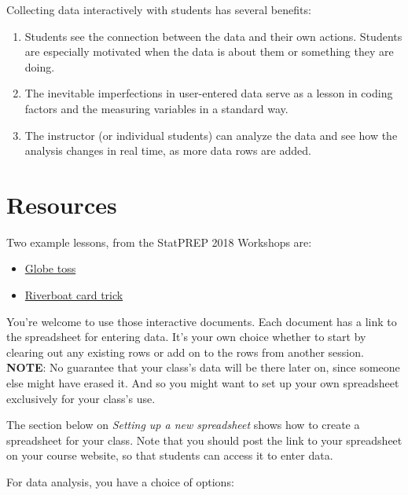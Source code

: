 \documentclass[]{book}
\providecommand{\tightlist}{%
  \setlength{\itemsep}{0pt}\setlength{\parskip}{0pt}}
\theoremstyle{definition}
\theoremstyle{definition}
\theoremstyle{definition}
\theoremstyle{remark}
\begin{document}
Collecting data interactively with students has several benefits:

\begin{enumerate}
\def\labelenumi{\arabic{enumi}.}
\tightlist
\item
  Students see the connection between the data and their own actions.
  Students are especially motivated when the data is about them or
  something they are doing.
\item
  The inevitable imperfections in user-entered data serve as a lesson in
  coding factors and the measuring variables in a standard way.
\item
  The instructor (or individual students) can analyze the data and see
  how the analysis changes in real time, as more data rows are added.
\end{enumerate}

\section{Resources}\label{resources}

Two example lessons, from the StatPREP 2018 Workshops are:

\begin{itemize}
\tightlist
\item
  \href{http://dtkaplan.shinyapps.io/tutorial_globe_toss.png}{Globe
  toss}
\item
  \href{http://dtkaplan.shinyapps.io/Tutorial_Riverboat_shuffle.png}{Riverboat
  card trick}
\end{itemize}

You're welcome to use those interactive documents. Each document has a
link to the spreadsheet for entering data. It's your own choice whether
to start by clearing out any existing rows or add on to the rows from
another session. \textbf{NOTE}: No guarantee that your class's data will
be there later on, since someone else might have erased it. And so you
might want to set up your own spreadsheet exclusively for your class's
use.

The section below on \emph{Setting up a new spreadsheet} shows how to
create a spreadsheet for your class. Note that you should post the link
to your spreadsheet on your course website, so that students can access
it to enter data.

For data analysis, you have a choice of options:
\end{document}

